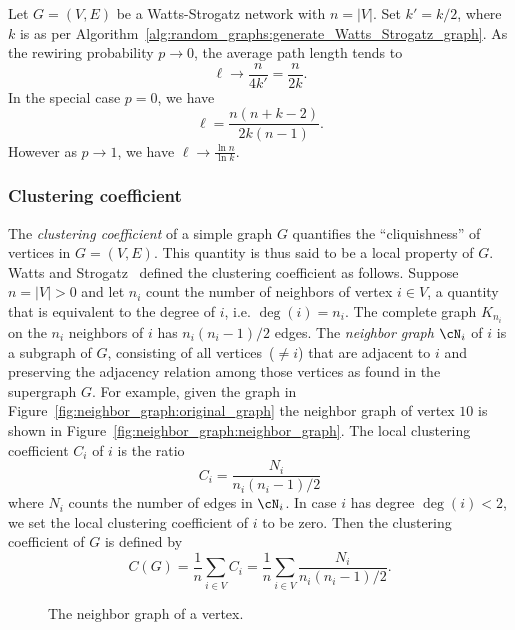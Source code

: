 Let $G = (V,E)$ be a Watts-Strogatz network with $n = |V|$. Set
$k' = k/2$, where $k$ is as per
Algorithm~\ref{alg:random_graphs:generate_Watts_Strogatz_graph}. As
the rewiring probability $p \to 0$, the average path length tends to
\[
\ell
\to
\frac{n}{4k'}
=
\frac{n}{2k}.
\]
In the special case $p = 0$, we have
\[
\ell
=
\frac{n (n + k - 2)} {2k (n - 1)}.
\]
However as $p \to 1$, we have $\ell \to \frac{\ln n} {\ln k}$.



\subsubsection{Clustering coefficient}

The \emph{clustering coefficient} of a
simple graph $G$ quantifies the ``cliquishness'' of vertices in
$G = (V,E)$. This quantity is thus said to be a local property of
$G$. Watts and Strogatz~\cite{WattsStrogatz1998} defined the
clustering coefficient as follows. Suppose $n = |V| > 0$ and let $n_i$
count the number of neighbors of vertex $i \in V$, a quantity that is
equivalent to the degree of $i$, i.e. $\deg(i) = n_i$. The complete
graph $K_{n_i}$ on the $n_i$ neighbors of $i$ has $n_i(n_i - 1) / 2$
edges. The \emph{neighbor graph}
$\cN_i$ of $i$ is a subgraph of $G$, consisting of all
vertices~($\neq i$) that are adjacent to $i$ and preserving the
adjacency relation among those vertices as found in the supergraph
$G$. For example, given the graph in
Figure~\ref{fig:neighbor_graph:original_graph} the neighbor graph of
vertex $10$ is shown in
Figure~\ref{fig:neighbor_graph:neighbor_graph}. The local clustering
coefficient $C_i$ of $i$ is the ratio
\[
C_i
=
\frac{N_i} {n_i (n_i - 1) / 2}
\]
where $N_i$ counts the number of edges in $\cN_i$. In case $i$ has
degree $\deg(i) < 2$, we set the local clustering coefficient of $i$
to be zero. Then the clustering
coefficient of $G$ is defined by
\[
C(G)
=
\frac{1}{n} \sum_{i \in V} C_i
=
\frac{1}{n} \sum_{i \in V} \frac{N_i} {n_i (n_i - 1) / 2}.
\]

\begin{figure}[!htbp]
\centering
{}

\caption{The neighbor graph of a vertex.}
\label{fig:random_graphs:neighbor_graph}
\end{figure}

